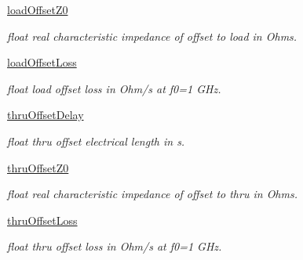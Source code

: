 \begin{DoxyCompactItemize}
\mbox{\label{classSignalIntegrity_1_1Measurement_1_1CalKit_1_1CalibrationKit_1_1CalibrationConstants_a2c39b9f8c8332452e6dc6be9f6d8e34f}} 
\hyperlink{classSignalIntegrity_1_1Measurement_1_1CalKit_1_1CalibrationKit_1_1CalibrationConstants_a2c39b9f8c8332452e6dc6be9f6d8e34f}{load\+Offset\+Z0}
\begin{DoxyCompactList}\small\item\em float real characteristic impedance of offset to load in Ohms. \end{DoxyCompactList}\item 
\hyperlink{classSignalIntegrity_1_1Measurement_1_1CalKit_1_1CalibrationKit_1_1CalibrationConstants_a0302588f72af9eb96fed0f8fa2c32266}{load\+Offset\+Loss}
\begin{DoxyCompactList}\small\item\em float load offset loss in Ohm/s at f0=1 G\+Hz. \end{DoxyCompactList}\item 
\hyperlink{classSignalIntegrity_1_1Measurement_1_1CalKit_1_1CalibrationKit_1_1CalibrationConstants_a3320bfd83bcf4354d51e43070c258c30}{thru\+Offset\+Delay}
\begin{DoxyCompactList}\small\item\em float thru offset electrical length in s. \end{DoxyCompactList}\item 
\mbox{\label{classSignalIntegrity_1_1Measurement_1_1CalKit_1_1CalibrationKit_1_1CalibrationConstants_a1dede18b91b68805a658e1f84ed943ff}} 
\hyperlink{classSignalIntegrity_1_1Measurement_1_1CalKit_1_1CalibrationKit_1_1CalibrationConstants_a1dede18b91b68805a658e1f84ed943ff}{thru\+Offset\+Z0}
\begin{DoxyCompactList}\small\item\em float real characteristic impedance of offset to thru in Ohms. \end{DoxyCompactList}\item 
\hyperlink{classSignalIntegrity_1_1Measurement_1_1CalKit_1_1CalibrationKit_1_1CalibrationConstants_a11b91c3f45fc1cbb23016dd377955c58}{thru\+Offset\+Loss}
\begin{DoxyCompactList}\small\item\em float thru offset loss in Ohm/s at f0=1 G\+Hz. \end{DoxyCompactList}\end{DoxyCompactItemize}


